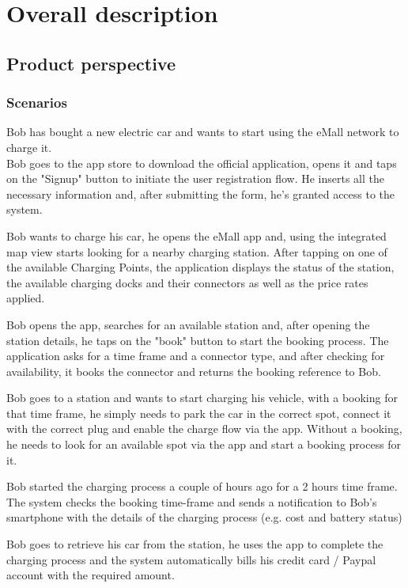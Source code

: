 \chapter{Overall description}
\section{Product perspective}
\subsection{Scenarios}

\begin{enumerate}
	Bob has bought a new electric car and wants to start using the eMall network to charge it.\\ Bob goes to the app store to download the official application, opens it and taps on the "Signup" button to initiate the user registration flow. He inserts all the necessary information and, after submitting the form, he's granted access to the system. 
	
	Bob wants to charge his car, he opens the eMall app and, using the integrated map view starts looking for a nearby charging station. After tapping on one of the available Charging Points, the application displays the status of the station, the available charging docks and their connectors as well as the price rates applied.
	
	Bob opens the app, searches for an available station and, after opening the station details, he taps on the "book" button to start the booking process. The application asks for a time frame and a connector type, and after checking for availability, it books the connector and returns the booking reference to Bob.
	
	Bob goes to a station and wants to start charging his vehicle, with a booking for that time frame, he simply needs to park the car in the correct spot, connect it with the correct plug and enable the charge flow via the app. Without a booking, he needs to look for an available spot via the app and start a booking process for it.
	
	Bob started the charging process a couple of hours ago for a 2 hours time frame. The system checks the booking time-frame and sends a notification to Bob's smartphone with the details of the charging process (e.g. cost and battery status)
	
	Bob goes to retrieve his car from the station, he uses the app to complete the charging process and the system automatically bills his credit card / Paypal account with the required amount.
\end{enumerate}

